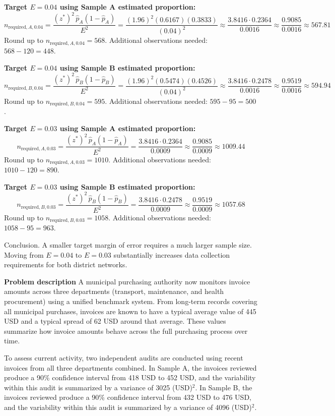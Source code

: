 \begin{ExamProblems}
		\textbf{Target $E = 0.04$ using Sample A estimated proportion:}
		\[
		n_{\text{required},A,0.04} = \frac{(z^*)^2\,\hat{p}_A(1-\hat{p}_A)}{E^2}
		= \frac{(1.96)^2(0.6167)(0.3833)}{(0.04)^2}
		\approx \frac{3.8416\cdot 0.2364}{0.0016}
		\approx \frac{0.9085}{0.0016}
		\approx 567.81
		\]
		Round up to $n_{\text{required},A,0.04} = 568$.
		Additional observations needed: $568 - 120 = 448$.
		
		\textbf{Target $E = 0.04$ using Sample B estimated proportion:}
		\[
		n_{\text{required},B,0.04} = \frac{(z^*)^2\,\hat{p}_B(1-\hat{p}_B)}{E^2}
		= \frac{(1.96)^2(0.5474)(0.4526)}{(0.04)^2}
		\approx \frac{3.8416\cdot 0.2478}{0.0016}
		\approx \frac{0.9519}{0.0016}
		\approx 594.94
		\]
		Round up to $n_{\text{required},B,0.04} = 595$.
		Additional observations needed: $595 - 95 = 500$.
		
		\textbf{Target $E = 0.03$ using Sample A estimated proportion:}
		\[
		n_{\text{required},A,0.03} = \frac{(z^*)^2\,\hat{p}_A(1-\hat{p}_A)}{E^2}
		= \frac{3.8416\cdot 0.2364}{0.0009}
		\approx \frac{0.9085}{0.0009}
		\approx 1009.44
		\]
		Round up to $n_{\text{required},A,0.03} = 1010$.
		Additional observations needed: $1010 - 120 = 890$.
		
		\textbf{Target $E = 0.03$ using Sample B estimated proportion:}
		\[
		n_{\text{required},B,0.03} = \frac{(z^*)^2\,\hat{p}_B(1-\hat{p}_B)}{E^2}
		= \frac{3.8416\cdot 0.2478}{0.0009}
		\approx \frac{0.9519}{0.0009}
		\approx 1057.68
		\]
		Round up to $n_{\text{required},B,0.03} = 1058$.
		Additional observations needed: $1058 - 95 = 963$.
		
		Conclusion.
		A smaller target margin of error requires a much larger sample size.
		Moving from $E = 0.04$ to $E = 0.03$ substantially increases data collection requirements for both district networks.
		
		\newpage
		\item
		\textbf{Problem description}
		A municipal purchasing authority now monitors invoice amounts across three departments (transport, maintenance, and health procurement) using a unified benchmark system. From long-term records covering all municipal purchases, invoices are known to have a typical average value of 445 USD and a typical spread of 62 USD around that average. These values summarize how invoice amounts behave across the full purchasing process over time.
		
		To assess current activity, two independent audits are conducted using recent invoices from all three departments combined. In Sample A, the invoices reviewed produce a 90\% confidence interval from 418 USD to 452 USD, and the variability within this audit is summarized by a variance of 3025 (USD)$^2$. In Sample B, the invoices reviewed produce a 90\% confidence interval from 432 USD to 476 USD, and the variability within this audit is summarized by a variance of 4096 (USD)$^2$.
		

\end{ExamProblems}
